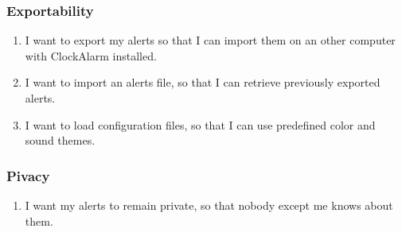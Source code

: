 \subsubsection{Exportability}
\begin{enumerate}
	\setcounter{enumi}{\value{counter}}
	\item I want to export my alerts so that I can import them on an other
        computer with ClockAlarm installed.
	\item I want to import an alerts file, so that I can retrieve previously
        exported alerts.
	\item I want to load configuration files, so that I can use predefined color
        and sound themes.
	\setcounter{counter}{\value{enumi}}
\end{enumerate}
\subsubsection{Pivacy}
\begin{enumerate}
	\setcounter{enumi}{\value{counter}}
	\item I want my alerts to remain private, so that nobody except me knows
        about them.
\end{enumerate}
